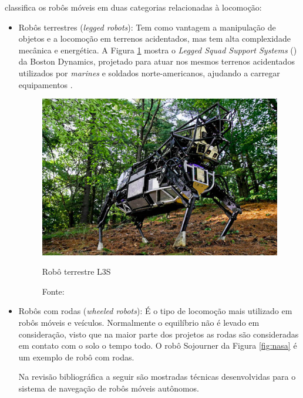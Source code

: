  classifica os robôs móveis em duas categorias relacionadas à locomoção: 
\begin{itemize}
 
 \item Robôs terrestres (\textit{legged robots}): Tem como vantagem a manipulação de objetos e a locomoção em terrenos 
acidentados, mas tem alta complexidade mecânica e energética. A Figura \ref{fig:boston} mostra o 
\textit{Legged Squad Support Systems} () da Boston Dynamics, 
projetado para atuar nos mesmos terrenos acidentados utilizados por \textit{marines} e soldados norte-americanos, 
ajudando a carregar equipamentos \cite{bostondyn}. 
\begin{figure}[h]
 \centering
 \captionsetup{width=0.44\textwidth,font=footnotesize,textfont=bf}
 \includegraphics[scale=0.4]{figuras/bostondyn.png}
 \caption{Robô terrestre  L3S\label{fig:boston}}
 \vspace{-0.3cm}
 \caption*{Fonte: \cite{bostondyn}}
\end{figure}


\item Robôs com rodas (\textit{wheeled robots}): É o tipo de locomoção mais utilizado em robôs móveis e veículos. Normalmente o 
equilíbrio não é levado em consideração, visto que na maior parte dos projetos as rodas são consideradas em contato com o solo 
o tempo todo. O robô Sojourner da Figura \ref{fig:nasa} é um exemplo de robô com rodas.\par

Na revisão bibliográfica a seguir são mostradas técnicas desenvolvidas para o sistema de navegação de robôs móveis autônomos.


\end{itemize}
